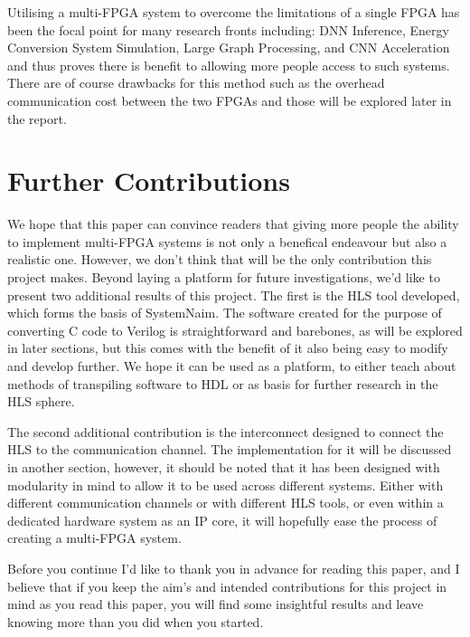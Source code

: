 Utilising a multi-FPGA system to overcome the limitations of a single FPGA has been the focal point for many research fronts including: DNN Inference\cite{10.1145/3358192}, Energy Conversion System Simulation\cite{8822485}, Large Graph Processing\cite{10.1145/3020078.3021739}, and CNN Acceleration \cite{10.1145/3337821.3337846} and thus proves there is benefit to allowing more people access to such systems. There are of course drawbacks for this method such as the overhead communication cost between the two FPGAs and those will be explored later in the report.


\section{Further Contributions}

We hope that this paper can convince readers that giving more people the ability to implement multi-FPGA systems is not only a benefical endeavour but also a realistic one. However, we don't think that will be the only contribution this project makes. Beyond laying a platform for future investigations, we'd like to present two additional results of this project. The first is the HLS tool developed, which forms the basis of SystemNaim. The software created for the purpose of converting C code to Verilog is straightforward and barebones, as will be explored in later sections, but this comes with the benefit of it also being easy to modify and develop further. We hope it can be used as a platform, to either teach about methods of transpiling software to HDL or as basis for further research in the HLS sphere.

The second additional contribution is the interconnect designed to connect the HLS to the communication channel. The implementation for it will be discussed in another section, however, it should be noted that it has been designed with modularity in mind to allow it to be used across different systems. Either with different communication channels or with different HLS tools, or even within a dedicated hardware system as an IP core, it will hopefully ease the process of creating a multi-FPGA system. 

Before you continue I'd like to thank you in advance for reading this paper, and I believe that if you keep the aim's and intended contributions for this project in mind as you read this paper, you will find some insightful results and leave knowing more than you did when you started.







